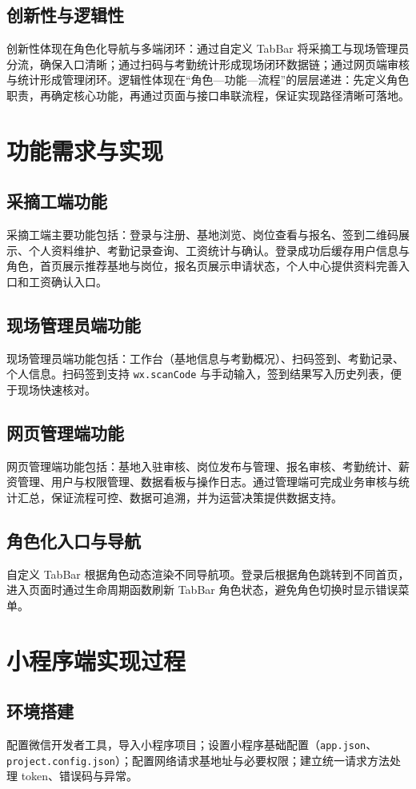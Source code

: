 ﻿\documentclass[UTF8,a4paper]{ctexart}
\begin{document}
\subsection{创新性与逻辑性}
创新性体现在角色化导航与多端闭环：通过自定义 TabBar 将采摘工与现场管理员分流，确保入口清晰；通过扫码与考勤统计形成现场闭环数据链；通过网页端审核与统计形成管理闭环。逻辑性体现在“角色—功能—流程”的层层递进：先定义角色职责，再确定核心功能，再通过页面与接口串联流程，保证实现路径清晰可落地。

\section{功能需求与实现}
\subsection{采摘工端功能}
采摘工端主要功能包括：登录与注册、基地浏览、岗位查看与报名、签到二维码展示、个人资料维护、考勤记录查询、工资统计与确认。登录成功后缓存用户信息与角色，首页展示推荐基地与岗位，报名页展示申请状态，个人中心提供资料完善入口和工资确认入口。

\subsection{现场管理员端功能}
现场管理员端功能包括：工作台（基地信息与考勤概况）、扫码签到、考勤记录、个人信息。扫码签到支持 \texttt{wx.scanCode} 与手动输入，签到结果写入历史列表，便于现场快速核对。

\subsection{网页管理端功能}
网页管理端功能包括：基地入驻审核、岗位发布与管理、报名审核、考勤统计、薪资管理、用户与权限管理、数据看板与操作日志。通过管理端可完成业务审核与统计汇总，保证流程可控、数据可追溯，并为运营决策提供数据支持。

\subsection{角色化入口与导航}
自定义 TabBar 根据角色动态渲染不同导航项。登录后根据角色跳转到不同首页，进入页面时通过生命周期函数刷新 TabBar 角色状态，避免角色切换时显示错误菜单。

\section{小程序端实现过程}
\subsection{环境搭建}
配置微信开发者工具，导入小程序项目；设置小程序基础配置（\texttt{app.json}、\texttt{project.config.json}）；配置网络请求基地址与必要权限；建立统一请求方法处理 token、错误码与异常。
\end{document}
